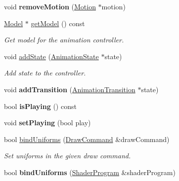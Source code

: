\begin{Indent}
\begin{DoxyCompactItemize}
\mbox{\label{classrev_1_1_animation_controller_a7965d8791ae2287eeb8e844f6047bd3e}} 
void {\bfseries remove\+Motion} (\mbox{\hyperlink{classrev_1_1_motion}{Motion}} $\ast$motion)
\item 
\mbox{\label{classrev_1_1_animation_controller_abf513d304d844d1de3fa2cac7f80ff1b}} 
\mbox{\hyperlink{classrev_1_1_model}{Model}} $\ast$ \mbox{\hyperlink{classrev_1_1_animation_controller_abf513d304d844d1de3fa2cac7f80ff1b}{get\+Model}} () const
\begin{DoxyCompactList}\small\item\em Get model for the animation controller. \end{DoxyCompactList}\item 
\mbox{\label{classrev_1_1_animation_controller_a40674a6167f0b8c035dc1a5d75dda4ab}} 
void \mbox{\hyperlink{classrev_1_1_animation_controller_a40674a6167f0b8c035dc1a5d75dda4ab}{add\+State}} (\mbox{\hyperlink{classrev_1_1_animation_state}{Animation\+State}} $\ast$state)
\begin{DoxyCompactList}\small\item\em Add state to the controller. \end{DoxyCompactList}\item 
\mbox{\label{classrev_1_1_animation_controller_af2fc11951ebac0de23eb6ee1d668ff80}} 
void {\bfseries add\+Transition} (\mbox{\hyperlink{classrev_1_1_animation_transition}{Animation\+Transition}} $\ast$state)
\item 
\mbox{\label{classrev_1_1_animation_controller_a3e0fb1710242082636ecf52e8da51363}} 
bool {\bfseries is\+Playing} () const
\item 
\mbox{\label{classrev_1_1_animation_controller_abdb78492ee055b9c5bdb1b25fb0ab1ae}} 
void {\bfseries set\+Playing} (bool play)
\item 
\mbox{\label{classrev_1_1_animation_controller_a9fdf9c4ac52aaccb8398500ed2527a08}} 
bool \mbox{\hyperlink{classrev_1_1_animation_controller_a9fdf9c4ac52aaccb8398500ed2527a08}{bind\+Uniforms}} (\mbox{\hyperlink{classrev_1_1_draw_command}{Draw\+Command}} \&draw\+Command)
\begin{DoxyCompactList}\small\item\em Set uniforms in the given draw command. \end{DoxyCompactList}\item 
\mbox{\label{classrev_1_1_animation_controller_acae4e72ebb88a820983b93c5e4bfe733}} 
bool {\bfseries bind\+Uniforms} (\mbox{\hyperlink{classrev_1_1_shader_program}{Shader\+Program}} \&shader\+Program)
\end{DoxyCompactItemize}
\end{Indent}
